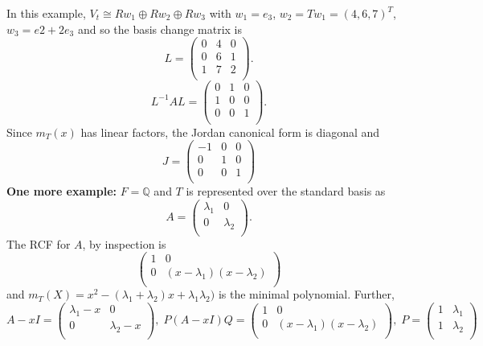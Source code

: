 In this example, $V_t \cong R w_1 \oplus Rw_2 \oplus Rw_3$ with $w_1= e_3$, $w_2=Tw_1 = (4,6,7)^T$,
$w_3 = e2+2 e_3$ and so the basis change matrix is
$$
L =
\left(
\begin{array}{ccc}
0 & 4 & 0\\
0 & 6 & 1\\
1  & 7 & 2\\
\end{array}
\right).
$$
$$
L^{-1}AL =
\left(
\begin{array}{ccc}
0 & 1 & 0\\
1 & 0 & 0\\
0  & 0 & 1\\
\end{array}
\right).
$$
Since $m_T(x)$ has linear factors, the Jordan canonical form is diagonal and
$$
J =
\left(
\begin{array}{ccc}
-1 & 0 & 0\\
0 & 1 & 0\\
0  & 0 & 1\\
\end{array}
\right)
$$
{\bf One more example:} $F = \mathbb{Q}$ and $T$ is represented over the standard basis as
$$
A =
\left(
\begin{array}{cc}
\lambda_1 & 0\\
0 & \lambda_2 \\
\end{array}
\right).
$$  The RCF for $A$, by inspection is 
$$
\left(
\begin{array}{cc}
1 & 0\\
0 & (x - \lambda_1) (x - \lambda_2)\\
\end{array}
\right)
$$
and $m_T(X)= x^2 -(\lambda_1 + \lambda_2) x + \lambda_1 \lambda_2)$ is the minimal polynomial.  Further,
$$
A-xI = 
\left(
\begin{array}{cc}
\lambda_1  - x& 0\\
0 & \lambda_2 - x\\
\end{array}
\right), \;
P(A-xI)Q = 
\left(
\begin{array}{cc}
1 & 0\\
0 & (x - \lambda_1) (x - \lambda_2)\\
\end{array}
\right), \;
P =
\left(
\begin{array}{cc}
1 & \lambda_1\\
1 & \lambda_2\\
\end{array}
\right)
$$
